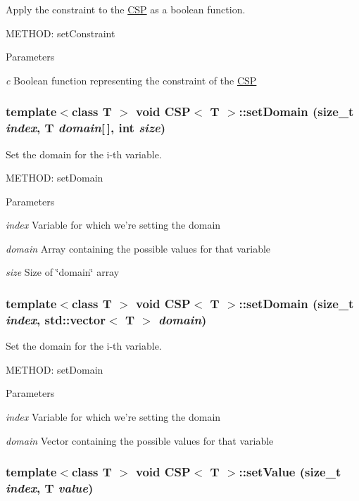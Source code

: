Apply the constraint to the \hyperlink{classCSP}{CSP} as a boolean function. 

METHOD: setConstraint 
\begin{DoxyParams}{Parameters}
\item[{\em c}]Boolean function representing the constraint of the \hyperlink{classCSP}{CSP} \end{DoxyParams}
\hypertarget{classCSP_a65518e67e33e31bff1b5f9aabdf80a01}{
\subsubsection[{setDomain}]{\setlength{\rightskip}{0pt plus 5cm}template$<$class T $>$ void {\bf CSP}$<$ T $>$::setDomain (size\_\-t {\em index}, \/  T {\em domain}\mbox{[}$\,$\mbox{]}, \/  int {\em size})}}
\label{classCSP_a65518e67e33e31bff1b5f9aabdf80a01}


Set the domain for the i-\/th variable. 

METHOD: setDomain 
\begin{DoxyParams}{Parameters}
\item[{\em index}]Variable for which we're setting the domain \item[{\em domain}]Array containing the possible values for that variable \item[{\em size}]Size of \char`\"{}domain\char`\"{} array \end{DoxyParams}
\hypertarget{classCSP_a4017c17aac9d3e96d0e821ebbe09da7b}{
\subsubsection[{setDomain}]{\setlength{\rightskip}{0pt plus 5cm}template$<$class T $>$ void {\bf CSP}$<$ T $>$::setDomain (size\_\-t {\em index}, \/  std::vector$<$ T $>$ {\em domain})}}
\label{classCSP_a4017c17aac9d3e96d0e821ebbe09da7b}


Set the domain for the i-\/th variable. 

METHOD: setDomain 
\begin{DoxyParams}{Parameters}
\item[{\em index}]Variable for which we're setting the domain \item[{\em domain}]Vector containing the possible values for that variable \end{DoxyParams}
\hypertarget{classCSP_ac25064c5b2d4e1020173b56913251ebd}{
\subsubsection[{setValue}]{\setlength{\rightskip}{0pt plus 5cm}template$<$class T $>$ void {\bf CSP}$<$ T $>$::setValue (size\_\-t {\em index}, \/  T {\em value})}}
\label{classCSP_ac25064c5b2d4e1020173b56913251ebd}


